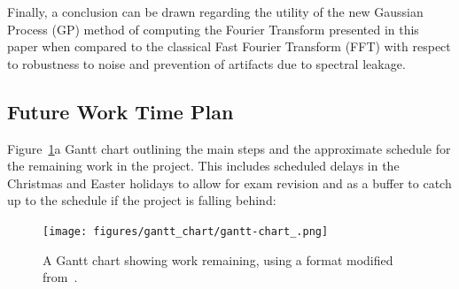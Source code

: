 \documentclass[12pt]{article}
\begin{document}
    Finally, a conclusion can be drawn regarding the utility of the new Gaussian Process (GP) method of computing the Fourier Transform presented in this paper when compared to the classical Fast Fourier Transform (FFT) with respect to robustness to noise and prevention of artifacts due to spectral leakage.

    \subsection{Future Work Time Plan}
    Figure~\ref{fig:gantt-chart_}a Gantt chart outlining the main steps and the approximate schedule for the remaining work in the project.
    This includes scheduled delays in the Christmas and Easter holidays to allow for exam revision and as a buffer to catch up to the schedule if the project is falling behind:

    \begin{landscape}
        \begin{figure}[p] %
            \centering
            \texttt{[image: figures/gantt\_chart/gantt-chart\_.png]}
            \caption{A Gantt chart showing work remaining, using a format modified from~\cite{DataCampGanttChart2021}.}
            \label{fig:gantt-chart_}
        \end{figure}
    \end{landscape}

%    

    \printbibliography
\end{document}
